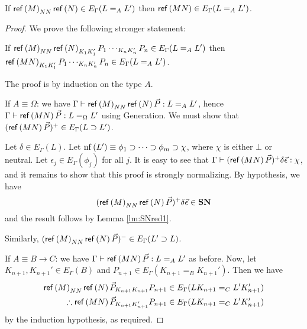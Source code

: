 \begin{lm}
\label{lm:Ered1}
If $\mathsf{ref} \left( {M} \right)_{N N} \mathsf{ref} \left( {N} \right) \in E_\Gamma(L =_A L')$ then $\mathsf{ref} \left( {MN} \right) \in E_\Gamma(L =_A L')$.
\end{lm}

\begin{proof}
We prove the following stronger statement:

If $\mathsf{ref} \left( {M} \right)_{N N} \mathsf{ref} \left( {N} \right)_{K_1 K_1'} P_1 \cdots_{K_n K_n'} P_n \in E_\Gamma(L =_A L')$ then \\
$\mathsf{ref} \left( {MN} \right)_{K_1 K_1'} P_1 \cdots_{K_n K_n'} P_n \in E_\Gamma(L =_A L')$.

The proof is by induction on the type $A$.

If $A \equiv \Omega$: we have $\Gamma \vdash \mathsf{ref} \left( {M} \right)_{N N} \mathsf{ref} \left( {N} \right) \vec{P} : L =_A L'$, hence $\Gamma \vdash \mathsf{ref} \left( {MN} \right) \vec{P} : L =_\Omega L'$
using Generation.  We must show that $(\mathsf{ref} \left( {MN} \right) \vec{P})^+ \in E_\Gamma(L \supset L')$.

Let $\delta \in E_\Gamma(L)$.  Let $\mathrm{nf} \left( {L'} \right) \equiv \phi_1 \supset \cdots \supset \phi_m \supset \chi$, where $\chi$ is either $\bot$ or neutral.  Let $\epsilon_j \in E_\Gamma(\phi_j)$ for all $j$.  
It is easy to see that $\Gamma \vdash (\mathsf{ref} \left( {MN} \right) \vec{P})^+ \delta \vec{\epsilon} : \chi$, and it remains to show that this proof is strongly normalizing.
By hypothesis, we have
\[ (\mathsf{ref} \left( {M} \right)_{NN} \mathsf{ref} \left( {N} \right) \vec{P})^+ \delta \vec{\epsilon} \in \mathbf{SN} \]
and the result follows by Lemma \ref{lm:SNred1}.

Similarly, $(\mathsf{ref} \left( {M} \right)_{NN} \mathsf{ref} \left( {N} \right) \vec{P})^- \in E_\Gamma(L' \supset L)$.

If $A \equiv B \rightarrow C$: we have $\Gamma \vdash \mathsf{ref} \left( {MN} \right) \vec{P} : L =_A L'$ as before.  Now, let $K_{n+1}, K_{n+1}' \in E_\Gamma(B)$
and $P_{n+1} \in E_\Gamma(K_{n+1} =_B K_{n+1}')$.  Then we have
\begin{align*}
\mathsf{ref} \left( {M} \right)_{N N} \mathsf{ref} \left( {N} \right) \vec{P}_{K_{n+1} K_{n+1}} P_{n+1} & \in E_\Gamma(LK_{n+1} =_C L'K_{n+1}') \\
\therefore \mathsf{ref} \left( {MN} \right) \vec{P}_{K_{n+1} K_{n+1}'} P_{n+1} & \in E_\Gamma(LK_{n+1} =_C L'K_{n+1}')
\end{align*}
by the induction hypothesis, as required.
\end{proof}



